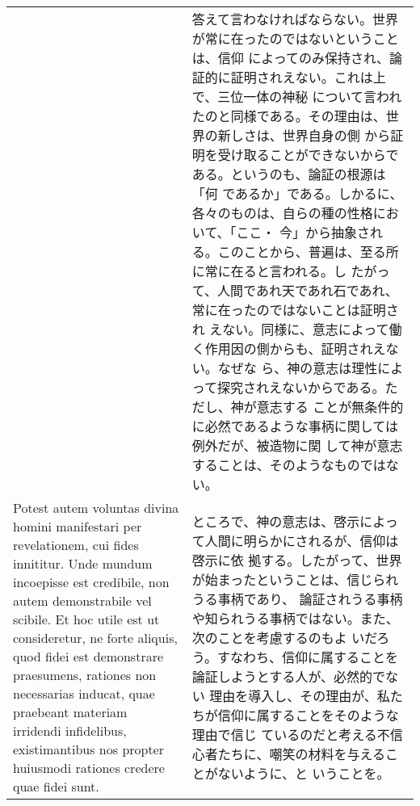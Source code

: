 \documentclass[10pt]{jsarticle} %
\begin{document}
\begin{longtable}{p{21em}p{21em}}
&

答えて言わなければならない。世界が常に在ったのではないということは、信仰
によってのみ保持され、論証的に証明されえない。これは上で、三位一体の神秘
について言われたのと同様である。その理由は、世界の新しさは、世界自身の側
から証明を受け取ることができないからである。というのも、論証の根源は「何
であるか」である。しかるに、各々のものは、自らの種の性格において、「ここ・
今」から抽象される。このことから、普遍は、至る所に常に在ると言われる。し
たがって、人間であれ天であれ石であれ、常に在ったのではないことは証明され
えない。同様に、意志によって働く作用因の側からも、証明されえない。なぜな
ら、神の意志は理性によって探究されえないからである。ただし、神が意志する
ことが無条件的に必然であるような事柄に関しては例外だが、被造物に関
して神が意志することは、そのようなものではない。

\\


Potest autem voluntas divina
 homini manifestari per revelationem, cui fides innititur. Unde mundum
 incoepisse est credibile, non autem demonstrabile vel scibile. Et hoc
 utile est ut consideretur, ne forte aliquis, quod fidei est demonstrare
 praesumens, rationes non necessarias inducat, quae praebeant materiam
 irridendi infidelibus, existimantibus nos propter huiusmodi rationes
 credere quae fidei sunt.
&

ところで、神の意志は、啓示によって人間に明らかにされるが、信仰は啓示に依
 拠する。したがって、世界が始まったということは、信じられうる事柄であり、
 論証されうる事柄や知られうる事柄ではない。また、次のことを考慮するのもよ
 いだろう。すなわち、信仰に属することを論証しようとする人が、必然的でない
 理由を導入し、その理由が、私たちが信仰に属することをそのような理由で信じ
 ているのだと考える不信心者たちに、嘲笑の材料を与えることがないように、と
 いうことを。

\\



\end{longtable}
\end{document}
